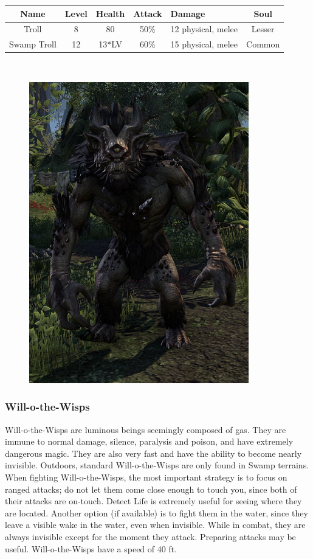 \documentclass[12pt]{book}
\begin{document}
\begin{tabular}{|c|c|c|c|p{}|c|}
\hline
Name & Level & Health & Attack & Damage & Soul\\ \hline
Troll & 8 & 80 & 50\% & 12 physical, melee & Lesser\\ \hline
Swamp Troll & 12 & 13*LV & 60\% & 15 physical, melee & Common\\ \hline
\end{tabular}\\

\begin{figure}[h]
	\centering
	\includegraphics[scale=1]{troll.png}
\end{figure}

\subsubsection{Will-o-the-Wisps}
Will-o-the-Wisps are luminous beings seemingly composed of gas. They are immune to normal damage, silence, paralysis and poison, and have extremely dangerous magic. They are also very fast and have the ability to become nearly invisible. Outdoors, standard Will-o-the-Wisps are only found in Swamp terrains. When fighting Will-o-the-Wisps, the most important strategy is to focus on ranged attacks; do not let them come close enough to touch you, since both of their attacks are on-touch. Detect Life is extremely useful for seeing where they are located. Another option (if available) is to fight them in the water, since they leave a visible wake in the water, even when invisible. While in combat, they are always invisible except for the moment they attack. Preparing attacks may be useful. Will-o-the-Wisps have a speed of 40 ft.\\
\end{document}
